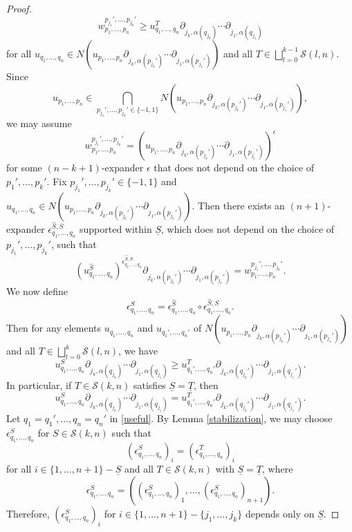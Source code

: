 \documentclass[10pt,a4paper]{amsart}
\begin{document}
\begin{proof}
		\[
		w_{p_1,\ldots,p_n}^{p_{j_1}',\ldots,p_{j_k}'}\ge u_{q_1,\ldots,q_n}^T\partial_{j_k,\alpha(q_{j_k})}\cdots\partial_{j_1,\alpha(q_{j_1})}
		\]
		for all $u_{q_1,\ldots,q_n}\in N(u_{p_1,\ldots,p_n}\partial_{j_k,\alpha(p_{j_k}')}\cdots\partial_{j_1,\alpha(p_{j_1}')})$ and all $T\in\bigsqcup_{l=0}^{k-1}\mathcal{S}(l,n)$. Since
		\[
		u_{p_1,\ldots,p_n}\in\bigcap_{p_{j_1}',\ldots,p_{j_k}'\in\{-1,1\}}N(u_{p_1,\ldots,p_n}\partial_{j_k,\alpha(p_{j_k}')}\cdots\partial_{j_1,\alpha(p_{j_1}')}),
		\]
		we may assume
		\[
		w_{p_1,\ldots,p_n}^{p_{j_1}',\ldots,p_{j_k}'}=(u_{p_1,\ldots,p_n}\partial_{j_k,\alpha(p_{j_k}')}\cdots\partial_{j_1,\alpha(p_{j_1}')})^\epsilon
		\]
		for some $(n-k+1)$-expander $\epsilon$ that does not depend on the choice of $p_1',\ldots,p_k'$. Fix $p_{j_1}',\ldots,p_{j_k}'\in\{-1,1\}$ and $u_{q_1,\ldots,q_n}\in N(u_{p_1,\ldots,p_n}\partial_{j_k,\alpha(p_{j_k}')}\cdots\partial_{j_1,\alpha(p_{j_1}')})$. Then there exists an $(n+1)$-expander $\epsilon_{q_1,\ldots,q_n}^{\widehat{S},S}$ supported within $\underline{S}$, which does not depend on the choice of $p_{j_1}',\ldots,p_{j_k}'$, such that
		\[
		(u_{q_1,\ldots,q_n}^{\widehat{S}})^{\epsilon_{q_1,\ldots,q_n}^{\widehat{S},S}}\partial_{j_k,\alpha(p_{j_k}')}\cdots\partial_{j_1,\alpha(p_{j_1}')}=w_{p_1,\ldots,p_n}^{p_{j_1}',\ldots,p_{j_k}'}.
		\]
		We now define
		\[
		\epsilon_{q_1,\ldots,q_n}^{S}=\epsilon_{q_1,\ldots,q_n}^{\widehat{S}}\circ\epsilon_{q_1,\ldots,q_n}^{\widehat{S},S}.
		\]
		Then for any elements $u_{q_1,\ldots,q_n}$ and $u_{q_1',\ldots,q_n'}$ of $N(u_{p_1,\ldots,p_n}\partial_{j_k,\alpha(p_{j_k}')}\cdots\partial_{j_1,\alpha(p_{j_1}')})$ and all $T\in\bigsqcup_{l=0}^{k}\mathcal{S}(l,n)$, we have
		\[
		u_{q_1,\ldots,q_n}^S\partial_{j_k,\alpha(q_{j_k})}\cdots\partial_{j_1,\alpha(q_{j_1})}\ge u_{q_1',\ldots,q_n'}^T\partial_{j_k,\alpha(q_{j_k}')}\cdots\partial_{j_1,\alpha(q_{j_1}')}.
		\]
		In particular, if $T\in\mathcal{S}(k,n)$ satisfies $\underline{S}=\underline{T}$, then
		\begin{equation}
			\label{useful}
			u_{q_1,\ldots,q_n}^S\partial_{j_k,\alpha(q_{j_k})}\cdots\partial_{j_1,\alpha(q_{j_1})}=u_{q_1',\ldots,q_n'}^T\partial_{j_k,\alpha(q_{j_k}')}\cdots\partial_{j_1,\alpha(q_{j_1}')}.
		\end{equation}
		Let $q_1=q_1',\ldots,q_n=q_n'$ in \eqref{useful}. By Lemma \ref{stabilization}, we may choose $\epsilon_{q_1,\ldots,q_n}^S$ for $S\in\mathcal{S}(k,n)$ such that
		\[
		(\epsilon_{q_1,\ldots,q_n}^S)_i=(\epsilon_{q_1,\ldots,q_n}^T)_i
		\]
		for all $i\in\{1,\ldots,n+1\}-\underline{S}$ and all $T\in\mathcal{S}(k,n)$ with $\underline{S}=\underline{T}$, where
		$$\epsilon_{q_1,\ldots,q_n}^S=((\epsilon_{q_1,\ldots,q_n}^S)_1,\ldots,(\epsilon_{q_1,\ldots,q_n}^S)_{n+1}).$$ 
		Therefore, $(\epsilon_{q_1,\ldots,q_n}^S)_i$ for $i\in\{1,\ldots,n+1\}-\{j_1,\ldots,j_k\}$ depends only on $\underline{S}$.
		

\end{proof}
\end{document}
